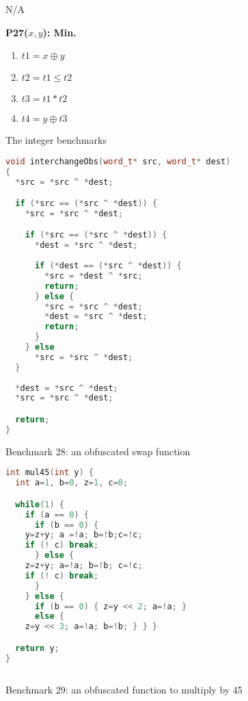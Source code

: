 \documentclass[a4paper]{llncs}
\begin{document}
\begin{figure}
\begin{multicols}{4}
\begin{minipage}{.2\textwidth}
N/A
   \end{minipage}

      \vspace{12pt}
   
   \begin{minipage}{.2\textwidth}
   {\bf P27($x, y$): Min.}
    \begin{enumerate}
     \item $t1 = x \oplus y$
     \item $t2 = t1 \leq t2$
     \item $t3 = t1 * t2$
     \item $t4 = y \oplus t3$
    \end{enumerate}
   \end{minipage}

   
 \end{multicols}

 \caption{The integer benchmarks}
\end{figure}

\begin{figure}
 \begin{lstlisting}[language=C++]
void interchangeObs(word_t* src, word_t* dest)
{
  *src = *src ^ *dest;

  if (*src == (*src ^ *dest)) {
    *src = *src ^ *dest;

    if (*src == (*src ^ *dest)) {
      *dest = *src ^ *dest;
      
      if (*dest == (*src ^ *dest)) {
        *src = *dest ^ *src;
        return;
      } else {
        *src = *src ^ *dest;
        *dest = *src ^ *dest;
        return;
      } 
    } else
      *src = *src ^ *dest;
  }
  
  *dest = *src ^ *dest;
  *src = *src ^ *dest;

  return;
}
 \end{lstlisting}

 \caption{Benchmark 28: an obfuscated swap function}
\end{figure}

\begin{figure}
 \begin{lstlisting}[language=C++]
int mul45(int y) {
  int a=1, b=0, z=1, c=0;

  while(1) {
    if (a == 0) {
      if (b == 0) {
	y=z+y; a =!a; b=!b;c=!c;
	if (! c) break;
      } else {
	z=z+y; a=!a; b=!b; c=!c;
	if (! c) break;
      }
    } else {
      if (b == 0) { z=y << 2; a=!a; }
      else {
	z=y << 3; a=!a; b=!b; } } }

  return y;
}
	
 \end{lstlisting}

 \caption{Benchmark 29: an obfuscated function to multiply by 45}
 
\end{figure}
\end{document}
